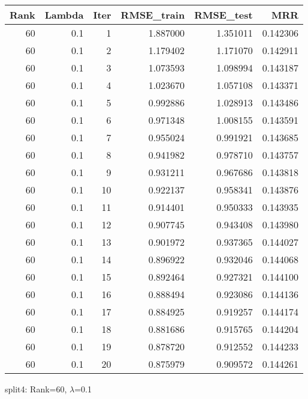 \begin{tabular}{rrrrrr}
\toprule
 Rank &  Lambda &  Iter &  RMSE\_train &  RMSE\_test &       MRR \\
\midrule
   60 &     0.1 &     1 &    1.887000 &   1.351011 &  0.142306 \\
   60 &     0.1 &     2 &    1.179402 &   1.171070 &  0.142911 \\
   60 &     0.1 &     3 &    1.073593 &   1.098994 &  0.143187 \\
   60 &     0.1 &     4 &    1.023670 &   1.057108 &  0.143371 \\
   60 &     0.1 &     5 &    0.992886 &   1.028913 &  0.143486 \\
   60 &     0.1 &     6 &    0.971348 &   1.008155 &  0.143591 \\
   60 &     0.1 &     7 &    0.955024 &   0.991921 &  0.143685 \\
   60 &     0.1 &     8 &    0.941982 &   0.978710 &  0.143757 \\
   60 &     0.1 &     9 &    0.931211 &   0.967686 &  0.143818 \\
   60 &     0.1 &    10 &    0.922137 &   0.958341 &  0.143876 \\
   60 &     0.1 &    11 &    0.914401 &   0.950333 &  0.143935 \\
   60 &     0.1 &    12 &    0.907745 &   0.943408 &  0.143980 \\
   60 &     0.1 &    13 &    0.901972 &   0.937365 &  0.144027 \\
   60 &     0.1 &    14 &    0.896922 &   0.932046 &  0.144068 \\
   60 &     0.1 &    15 &    0.892464 &   0.927321 &  0.144100 \\
   60 &     0.1 &    16 &    0.888494 &   0.923086 &  0.144136 \\
   60 &     0.1 &    17 &    0.884925 &   0.919257 &  0.144174 \\
   60 &     0.1 &    18 &    0.881686 &   0.915765 &  0.144204 \\
   60 &     0.1 &    19 &    0.878720 &   0.912552 &  0.144233 \\
   60 &     0.1 &    20 &    0.875979 &   0.909572 &  0.144261 \\
\bottomrule
\end{tabular}

\caption{split4: Rank=60, $\lambda$=0.1}
